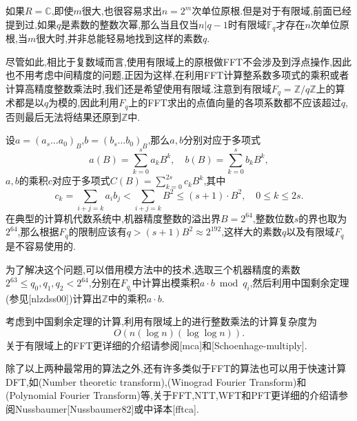 \documentclass{ctexart}
\newcommand\mtcasCite[1]{[#1]}
\theoremstyle{remark}
\theoremstyle{definition}
\begin{document}
如果$R=\mathbb{C}$,即使$m$很大,也很容易求出$n=2^m$次单位原根.但是对于有限域,前面已经提到过,如果$q$是素数的整数次幂,那么当且仅当$n|q-1$时有限域$\mathbb{F}_q$才存在$n$次单位原根,当$m$很大时,并非总能轻易地找到这样的素数$q$.

尽管如此,相比于复数域而言,使用有限域上的原根做FFT不会涉及到浮点操作,因此也不用考虑中间精度的问题,正因为这样,在利用FFT计算整系数多项式的乘积或者计算高精度整数乘法时,我们还是希望使用有限域.注意到有限域$F_q=\mathbb{Z}/q\mathbb{Z}$上的算术都是以$q$为模的,因此利用$F_q$上的FFT求出的点值向量的各项系数都不应该超过$q$,否则最后无法将结果还原到$\mathbb{Z}$中.

设$a=(a_s\ldots a_0)_B$,$b=(b_s\ldots b_0)_B$,那么$a,b$分别对应于多项式$$a(B)=\sum_{k=0}^sa_kB^k,\quad b(B)=\sum_{k=0}^sb_kB^k,$$
$a,b$的乘积$c$对应于多项式$C(B)=\sum\limits_{k=0}^{2s}c_kB^k$,其中$$c_k=\sum_{i+j=k}a_ib_j<\sum_{i+j=k}B^2\le(s+1)\cdot B^2,\quad 0\le k\le 2s.$$在典型的计算机代数系统中,机器精度整数的溢出界$B=2^{64}$,整数位数$s$的界也取为$2^{64}$,那么根据$F_q$的限制应该有$q>(s+1)B^2\approx 2^{192}$,这样大的素数$q$以及有限域$F_q$是不容易使用的.

为了解决这个问题,可以借用模方法中的技术,选取三个机器精度的素数$2^{63}\le q_0,q_1,q_2<2^{64}$,分别在$F_{q_i}$中计算出模乘积$a\cdot b\bmod q_i$,然后利用中国剩余定理(参见\mtcasCite{nlzdss00})计算出$\mathbb{Z}$中的乘积$a\cdot b$.

考虑到中国剩余定理的计算,利用有限域上的进行整数乘法的计算复杂度为$$O(n(\log{n})(\log{\log{n}})).$$关于有限域上的FFT更详细的介绍请参阅\mtcasCite{mca}和\mtcasCite{Schoenhage-multiply}.

除了以上两种最常用的算法之外,还有许多类似于FFT的算法也可以用于快速计算DFT,如(Number theoretic transform),(Winograd Fourier Transform)和(Polynomial Fourier Transform)等,关于FFT,NTT,WFT和PFT更详细的介绍请参阅Nussbaumer\mtcasCite{Nussbaumer82}或中译本\mtcasCite{fftca}.


\printindex
\end{document}
